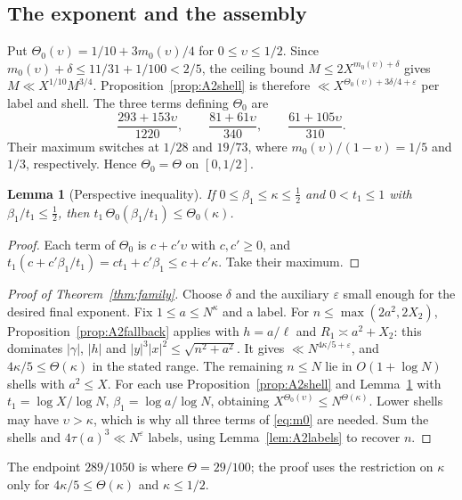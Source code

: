 \documentclass[11pt,reqno]{amsart}
\newtheorem{lemma}[theorem]{Lemma}
\theoremstyle{definition}
\theoremstyle{remark}
\numberwithin{equation}{section}
\newcommand{\eps}{\varepsilon}\newcommand{\card}{\#}
\begin{document}
\subsection{The exponent and the assembly}
Put $\Theta_0(\upsilon)=1/10+3m_0(\upsilon)/4$ for
$0\le\upsilon\le1/2$. Since
$m_0(\upsilon)+\delta\le11/31+1/100<2/5$, the ceiling bound
$M\le2X^{m_0(\upsilon)+\delta}$ gives
$M\ll X^{1/10}M^{3/4}$. Proposition~\ref{prop:A2shell} is therefore
$\ll X^{\Theta_0(\upsilon)+3\delta/4+\eps}$ per label and shell.
The three terms defining $\Theta_0$ are
\[
 \frac{293+153\upsilon}{1220},\qquad\frac{81+61\upsilon}{340},\qquad
 \frac{61+105\upsilon}{310}.
\]
Their maximum switches at $1/28$ and $19/73$, where
$m_0(\upsilon)/(1-\upsilon)=1/5$ and $1/3$, respectively.
Hence $\Theta_0=\Theta$ on $[0,1/2]$.

\begin{lemma}[Perspective inequality]\label{lem:perspective}
If $0\le\beta_1\le\kappa\le\frac12$ and $0<t_1\le1$ with $\beta_1/t_1\le\frac12$,
then $t_1\,\Theta_0(\beta_1/t_1)\le\Theta_0(\kappa)$.
\end{lemma}
\begin{proof}
Each term of $\Theta_0$ is $c+c'\upsilon$ with $c,c'\ge0$, and
$t_1(c+c'\beta_1/t_1)=ct_1+c'\beta_1\le c+c'\kappa$.
Take their maximum.
\end{proof}

\begin{proof}[Proof of Theorem~\ref{thm:family}]
Choose $\delta$ and the auxiliary $\eps$ small enough for the desired
final exponent. Fix $1\le a\le N^\kappa$ and a label.
For $n\le\max(2a^2,2X_2)$, Proposition~\ref{prop:A2fallback} applies
with $h=a/\ell$ and $R_1\asymp a^2+X_2$: this dominates
$|\gamma|$, $|h|$ and $|y|^3|x|^2\le\sqrt{n^2+a^2}$.
It gives $\ll N^{4\kappa/5+\eps}$, and
$4\kappa/5\le\Theta(\kappa)$ in the stated range.
The remaining $n\le N$ lie in $O(1+\log N)$ shells with $a^2\le X$.
For each use Proposition~\ref{prop:A2shell} and
Lemma~\ref{lem:perspective} with
$t_1=\log X/\log N$, $\beta_1=\log a/\log N$, obtaining
$X^{\Theta_0(\upsilon)}\le N^{\Theta(\kappa)}$.
Lower shells may have $\upsilon>\kappa$, which is why all three
terms of \eqref{eq:m0} are needed. Sum the shells and
$4\tau(a)^3\ll N^\eps$ labels, using
Lemma~\ref{lem:A2labels} to recover $n$.
\end{proof}
The endpoint $289/1050$ is where $\Theta=29/100$; the proof uses
the restriction on $\kappa$ only for
$4\kappa/5\le\Theta(\kappa)$ and $\kappa\le1/2$.
\end{document}
